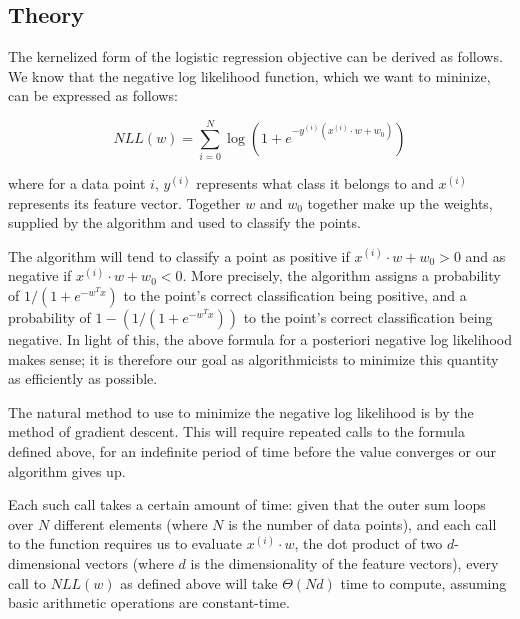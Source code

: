 \documentclass{sigchi}
\begin{document}
\subsection{Theory}

The kernelized form of the logistic regression objective can be derived as follows. We know that the negative log likelihood function, which we want to mininize, can be expressed as follows:

\begin{equation}NLL(w) = \sum_{i=0}^N \log{\left(1+e^{-y^{(i)}(x^{(i)}\cdot w + w_0)}\right)}\end{equation}

where for a data point $i$, $y^{(i)}$ represents what class it belongs to and $x^{(i)}$ represents its feature vector. Together $w$ and $w_0$ together make up the weights, supplied by the algorithm and used to classify the points.

The algorithm will tend to classify a point as positive if $x^{(i)} \cdot w + w_0 > 0$ and as negative if $x^{(i)} \cdot w + w_0 < 0$. More precisely, the algorithm assigns a probability of $1/(1+e^{-w^T x})$ to the point's correct classification being positive, and a probability of $1 - (1/(1+e^{-w^T x}))$ to the point's correct classification being negative. In light of this, the above formula for a posteriori negative log likelihood makes sense; it is therefore our goal as algorithmicists to minimize this quantity as efficiently as possible.

The natural method to use to minimize the negative log likelihood is by the method of gradient descent. This will require repeated calls to the formula defined above, for an indefinite period of time before the value converges or our algorithm gives up.

Each such call takes a certain amount of time: given that the outer sum loops over $N$ different elements (where $N$ is the number of data points), and each call to the function requires us to evaluate $x^{(i)} \cdot w$, the dot product of two $d$-dimensional vectors (where $d$ is the dimensionality of the feature vectors), every call to $NLL(w)$ as defined above will take $\Theta(Nd)$ time to compute, assuming basic arithmetic operations are constant-time.

\end{document}
